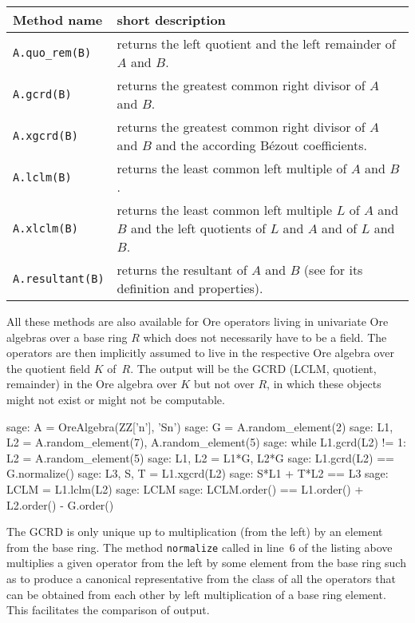 \documentclass[11pt]{amsart}
\begin{document}
\begin{center}
  \begin{tabular}{|l|p{.65\hsize}|}
    \hline
    Method name & short description \\\hline
    \verb|A.quo_rem(B)| & returns the left quotient and the left remainder of $A$ and $B$.\\
    \verb|A.gcrd(B)| & returns the greatest common right divisor of $A$ and $B$.\\
    \verb|A.xgcrd(B)| & returns the greatest common right divisor of $A$ and $B$ and the according B\'ezout coefficients.\\
    \verb|A.lclm(B)| & returns the least common left multiple of $A$ and $B$.\\
    \verb|A.xlclm(B)| & returns the least common left multiple $L$ of $A$ and $B$ and the left quotients of $L$ and $A$ and of $L$ and $B$.\\
    \verb|A.resultant(B)| & returns the resultant of $A$ and $B$ (see \cite{li96} for its definition and
    properties).\\
    \hline
  \end{tabular}
\end{center}

All these methods are also available for Ore operators living in univariate Ore
algebras over a base ring $R$ which does not necessarily have to be a
field. The operators are then implicitly assumed to live in the respective Ore
algebra over the quotient field $K$ of~$R$. The output will be the
GCRD (LCLM, quotient, remainder) in the Ore algebra over $K$ but not over
$R$, in which these objects might not exist or might not be computable.

\begin{sageexample}
  sage: A = OreAlgebra(ZZ['n'], 'Sn')
  sage: G = A.random_element(2)
  sage: L1, L2 = A.random_element(7), A.random_element(5)
  sage: while L1.gcrd(L2) != 1: L2 = A.random_element(5)                       
  sage: L1, L2 = L1*G, L2*G                                                        
  sage: L1.gcrd(L2) == G.normalize()
  sage: L3, S, T = L1.xgcrd(L2)                             
  sage: S*L1 + T*L2 == L3
  sage: LCLM = L1.lclm(L2)
  sage: LCLM %
  sage: LCLM.order() == L1.order() + L2.order() - G.order()
\end{sageexample}

The GCRD is only unique up to multiplication (from the left) by an element from
the base ring. The method \verb|normalize| called in line~6 of the listing above
multiplies a given operator from the left by some element from the base ring
such as to produce a canonical representative from the class of all the operators
that can be obtained from each other by left multiplication of a base ring
element. This facilitates the comparison of output.
\end{document}
